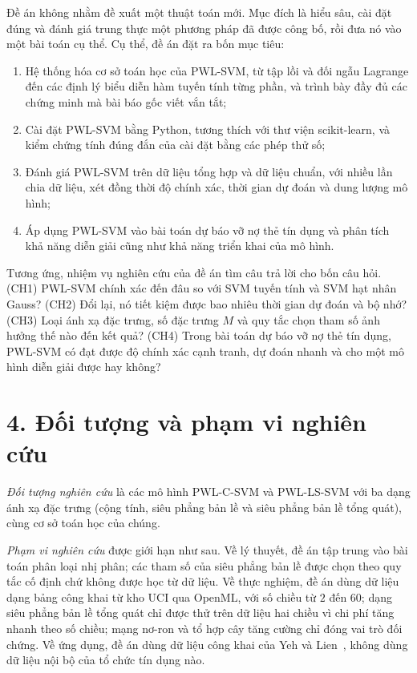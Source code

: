 Đề án không nhằm đề xuất một thuật toán mới. Mục đích là hiểu sâu, cài đặt đúng và đánh giá trung thực một phương pháp đã được công bố, rồi đưa nó vào một bài toán cụ thể. Cụ thể, đề án đặt ra bốn mục tiêu:
\begin{enumerate}[label=(\roman*)]
\item Hệ thống hóa cơ sở toán học của PWL-SVM, từ tập lồi và đối ngẫu Lagrange đến các định lý biểu diễn hàm tuyến tính từng phần, và trình bày đầy đủ các chứng minh mà bài báo gốc viết vắn tắt;
\item Cài đặt PWL-SVM bằng Python, tương thích với thư viện scikit-learn, và kiểm chứng tính đúng đắn của cài đặt bằng các phép thử số;
\item Đánh giá PWL-SVM trên dữ liệu tổng hợp và dữ liệu chuẩn, với nhiều lần chia dữ liệu, xét đồng thời độ chính xác, thời gian dự đoán và dung lượng mô hình;
\item Áp dụng PWL-SVM vào bài toán dự báo vỡ nợ thẻ tín dụng và phân tích khả năng diễn giải cũng như khả năng triển khai của mô hình.
\end{enumerate}
Tương ứng, nhiệm vụ nghiên cứu của đề án tìm câu trả lời cho bốn câu hỏi. (CH1) PWL-SVM chính xác đến đâu so với SVM tuyến tính và SVM hạt nhân Gauss? (CH2) Đổi lại, nó tiết kiệm được bao nhiêu thời gian dự đoán và bộ nhớ? (CH3) Loại ánh xạ đặc trưng, số đặc trưng $M$ và quy tắc chọn tham số ảnh hưởng thế nào đến kết quả? (CH4) Trong bài toán dự báo vỡ nợ thẻ tín dụng, PWL-SVM có đạt được độ chính xác cạnh tranh, dự đoán nhanh và cho một mô hình diễn giải được hay không?

\section*{4. Đối tượng và phạm vi nghiên cứu}

\emph{Đối tượng nghiên cứu} là các mô hình PWL-C-SVM và PWL-LS-SVM với ba dạng ánh xạ đặc trưng (cộng tính, siêu phẳng bản lề và siêu phẳng bản lề tổng quát), cùng cơ sở toán học của chúng. 

\emph{Phạm vi nghiên cứu} được giới hạn như sau. Về lý thuyết, đề án tập trung vào bài toán phân loại nhị phân; các tham số của siêu phẳng bản lề được chọn theo quy tắc cố định chứ không được học từ dữ liệu. Về thực nghiệm, đề án dùng dữ liệu dạng bảng công khai từ kho UCI qua OpenML, với số chiều từ $2$ đến $60$; dạng siêu phẳng bản lề tổng quát chỉ được thử trên dữ liệu hai chiều vì chi phí tăng nhanh theo số chiều; mạng nơ-ron và tổ hợp cây tăng cường chỉ đóng vai trò đối chứng. Về ứng dụng, đề án dùng dữ liệu công khai của Yeh và Lien~\cite{yeh2009}, không dùng dữ liệu nội bộ của tổ chức tín dụng nào.

